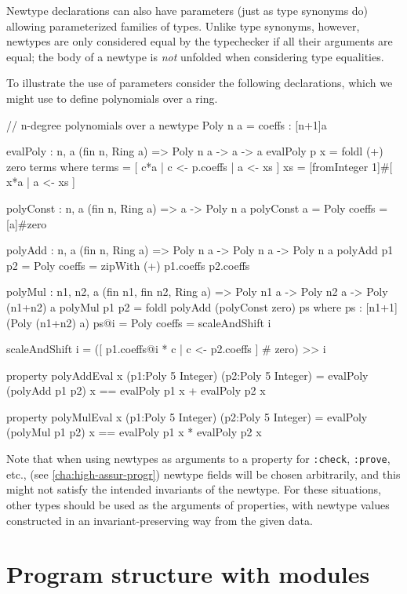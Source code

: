 Newtype declarations can also have parameters (just as type synonyms
do) allowing parameterized families of types.  Unlike type synonyms,
however, newtypes are only considered equal by the typechecker if all
their arguments are equal; the body of a newtype is \emph{not}
unfolded when considering type equalities.

To illustrate the use of parameters consider the following
declarations, which we might use to define polynomials over a ring.

\begin{code}
  // n-degree polynomials over a
  newtype Poly n a = { coeffs : [n+1]a }

  evalPoly : {n, a} (fin n, Ring a) => Poly n a -> a -> a
  evalPoly p x = foldl (+) zero terms
    where
      terms = [ c*a | c <- p.coeffs | a <- xs ]
      xs    = [fromInteger 1]#[ x*a | a <- xs ]

  polyConst : {n, a} (fin n, Ring a) => a -> Poly n a
  polyConst a = Poly { coeffs = [a]#zero }

  polyAdd : {n, a} (fin n, Ring a) => Poly n a -> Poly n a -> Poly n a
  polyAdd p1 p2 = Poly { coeffs = zipWith (+) p1.coeffs p2.coeffs }

  polyMul : {n1, n2, a} (fin n1, fin n2, Ring a) =>
    Poly n1 a -> Poly n2 a -> Poly (n1+n2) a
  polyMul p1 p2 = foldl polyAdd (polyConst zero) ps
    where
      ps : [n1+1](Poly (n1+n2) a)
      ps@i = Poly{ coeffs = scaleAndShift i }

      scaleAndShift i =
        ([ p1.coeffs@i * c | c <- p2.coeffs ] # zero) >> i

  property polyAddEval x (p1:Poly 5 Integer) (p2:Poly 5 Integer) =
    evalPoly (polyAdd p1 p2) x == evalPoly p1 x + evalPoly p2 x

  property polyMulEval x (p1:Poly 5 Integer) (p2:Poly 5 Integer) =
    evalPoly (polyMul p1 p2) x == evalPoly p1 x * evalPoly p2 x
\end{code}

Note that when using newtypes as arguments to a property for
\texttt{:check}, \texttt{:prove}, etc., (see
\ref{cha:high-assur-progr}) newtype fields will be chosen arbitrarily,
and this might not satisfy the intended invariants of the newtype.
For these situations, other types should be used as the arguments of
properties, with newtype values constructed in an invariant-preserving
way from the given data.

\section{Program structure with modules}

